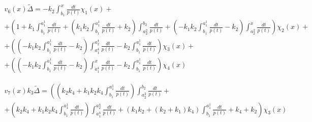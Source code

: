\documentclass[a4paper,12pt]{article} %
\begin{document}
\begin{multline}
	{v_6(x)}{\tilde{\Delta}}=
	-k_2 \int_{b_1}^{x}\frac{dt}{p(t)} \chi_1(x)
	+\\+
	\left( 1+k_1 \int_{b_1}^{a_1^1}\frac{dt}{p(t)}+\left( k_1 k_2 \int_{b_1}^{a_1^1}\frac{dt}{p(t)}+k_2\right)  \int_{a_2^2}^{b_2}\frac{dt}{p(t)}+\left( -k_1 k_2 \int_{b_1}^{a_1^1}\frac{dt}{p(t)}-k_2\right)  \int_{a_2^2}^{x}\frac{dt}{p(t)}\right)  \chi_2(x)
	+\\+
	\left( \left( -k_1 k_2 \int_{b_1}^{a_1^1}\frac{dt}{p(t)}-k_2\right)  \int_{a_1^4}^{a_2^4}\frac{dt}{p(t)}-k_2 \int_{b_1}^{a_1^1}\frac{dt}{p(t)}\right)  \chi_3(x)
	+\\+
	\left( \left( -k_1 k_2 \int_{b_1}^{a_1^1}\frac{dt}{p(t)}-k_2\right)  \int_{a_1^4}^{x}\frac{dt}{p(t)}-k_2 \int_{b_1}^{a_1^1}\frac{dt}{p(t)}\right)  \chi_4(x)
\end{multline}

\begin{multline}
	{v_7(x)}k_3{\tilde{\Delta}}=
	\left(
		\left( k_2 k_4+k_1 k_2 k_4 \int_{b_1}^{a_1^1}\frac{dt}{p(t)}\right)  \int_{a_2^2}^{b_2}\frac{dt}{p(t)}
		\right. +\\+ \left.
		\left( k_2 k_4+k_1 k_2 k_4 \int_{b_1}^{a_1^1}\frac{dt}{p(t)}\right)  \int_{a_1^4}^{a_2^4}\frac{dt}{p(t)}+\left( k_1 k_2+\left( k_2+k_1\right)  k_4\right)  \int_{b_1}^{a_1^1}\frac{dt}{p(t)}+k_4+k_2
	\right)\chi_3(x)
\end{multline}
\end{document}
